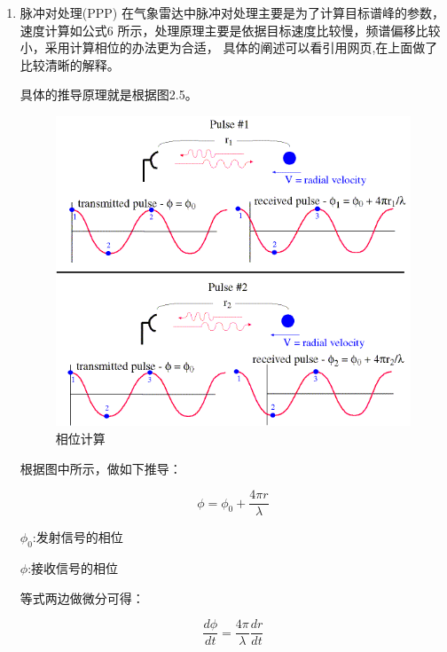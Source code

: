 \documentclass[a4paper,12pt]{report}
\begin{document}
\begin{spacing}{1.5}
\begin{enumerate}[1)]
    \item 脉冲对处理(PPP)\cite{FundamentalsOfRadarSignalProcessing}\cite{radarmeter}
    \cite{RadarManual}在气象雷达中脉冲对处理主要是为了计算目标谱峰的参数，速度计算如公式6
    所示，处理原理主要是依据目标速度比较慢，频谱偏移比较小，采用计算相位的办法更为合适，
    具体的阐述可以看引用网页\cite{dopler.web},在上面做了比较清晰的解释。

    具体的推导原理就是根据图2.5。
    \begin{figure}[hbtp]
        \centering
        \includegraphics [width=1.0\textwidth]{figure//pulse.png}
        \caption{相位计算}\label{pulse}
    \end{figure}

    根据图中所示，做如下推导：

    \begin{proposition}[相位计算推导公式]
        
        \begin{equation}
            \phi = \phi_0 +　\frac{4\pi r}{\lambda}
        \end{equation}

        $\phi_0$:发射信号的相位

        $\phi$:接收信号的相位

        等式两边做微分可得：

        \begin{equation}
            \frac{d\phi}{dt}=\frac{4\pi}{\lambda}\frac{dr}{dt}
        \end{equation}


\end{proposition}
\end{enumerate}
\end{spacing}
\end{document}
